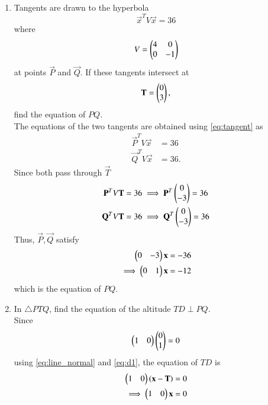 \renewcommand{\theequation}{\theenumi}
\begin{enumerate}[label=\arabic*.,ref=\thesubsection.\theenumi]
\item Tangents are drawn to the hyperbola 
\begin{equation}
\vec{x}^TV\vec{x} =36 
\label{eq:hyper}
\end{equation}
%
where
\begin{equation}
V = \begin{pmatrix}4 & 0 \\ 0 & -1\end{pmatrix}
\label{eq:hyperv}
\end{equation}
%
at points $\vec{P}$ and $\vec{Q}$.  If these tangents intersect at 
\begin{equation}
\mathbf{T}= \begin{pmatrix}0 \\ 3\end{pmatrix},
\end{equation}
%
find the equation of $PQ$.
\\
\solution The equations of the two tangents are obtained using \eqref{eq:tangent} as
\begin{align}
\vec{P}^TV\vec{x} &=36
\\
\vec{Q}^TV\vec{x}  &=36.
\end{align}		
%
Since both pass through $\vec{T}$
\begin{align}
\label{eq:hyperp}
\mathbf{P}^TV\mathbf{T}  &=36 \implies \mathbf{P}^T\begin{pmatrix}0  \\  -3\end{pmatrix} = 36
\\
\mathbf{Q}^TV\mathbf{T}  &=36 \implies \mathbf{Q}^T\begin{pmatrix}0  \\  -3\end{pmatrix} = 36
\label{eq:hyperq}
\end{align}
Thus, $\vec{P}, \vec{Q}$ satisfy
\begin{align}
\begin{pmatrix}0 &  -3\end{pmatrix}\mathbf{x} &= -36
\\
\implies \begin{pmatrix}0 &  1\end{pmatrix}\mathbf{x} &= -12
\label{eq:d1}
\end{align}
%
which is the equation of $PQ$.
\item In $\triangle PTQ$, find the equation of the altitude $TD \perp PQ$.
\\
\solution Since 
\begin{align}
 \begin{pmatrix}1 &  0\end{pmatrix} \begin{pmatrix}0 \\  1\end{pmatrix}=0
\end{align}
using \eqref{eq:line_normal} and \eqref{eq:d1},
the equation of $TD$ is
\begin{align}
\begin{pmatrix}1 & 0\end{pmatrix}\left(\mathbf{x}-\mathbf{T}\right) &= 0
\\
\implies \begin{pmatrix}1 & 0\end{pmatrix}\mathbf{x} &= 0
\label{eq:d2}
\end{align}

\end{enumerate}
